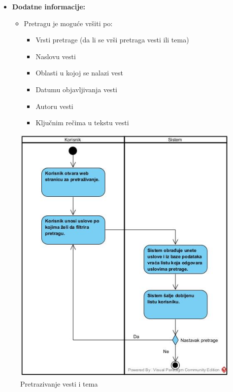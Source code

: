 \documentclass{article}
\begin{document}
\begin{itemize}
\begin{itemize}
		\end{itemize}
	\item \textbf{Dodatne informacije:}
        \begin{itemize}
            \item Pretragu je moguće vršiti po:
                \begin{itemize}
                    \item Vrsti pretrage (da li se vrši pretraga vesti ili tema)
                    \item Naslovu vesti
                    \item Oblasti u kojoj se nalazi vest
                    \item Datumu objavljivanja vesti
                    \item Autoru vesti
                    \item Ključnim rečima u tekstu vesti
                \end{itemize}
        \end{itemize}
\end{itemize}

\begin{figure}[htbp!]
    \centering
    \includegraphics[scale=0.7]{Pretrazivanje_vesti_i_tema.jpg}
    \caption{Pretrazivanje vesti i tema}
    \label{slk:dtp}
\end{figure}

\newpage
\end{document}
